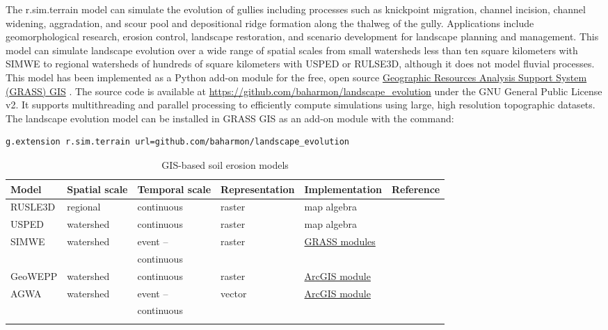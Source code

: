 \documentclass[gmd, manuscript]{copernicus}
\begin{document}
The r.sim.terrain model
can simulate the evolution of gullies
including processes such as 
knickpoint migration,
channel incision, 
channel widening, 
aggradation, and
scour pool and 
depositional ridge formation
along the thalweg of the gully. 
Applications include 
geomorphological research,
erosion control, 
landscape restoration, 
and scenario development 
for landscape planning and management.
This model can simulate landscape evolution 
over a wide range of spatial scales 
from small watersheds 
less than ten square kilometers
with SIMWE
to regional watersheds
of hundreds of square kilometers
with USPED or RULSE3D,
although it does not model fluvial processes. 
This model has been implemented 
as a Python add-on module 
for the free, open source
\href{https://grass.osgeo.org/}{Geographic Resources Analysis Support System (GRASS) GIS}
\citep{GRASS}. 
The source code is available at 
\url{https://github.com/baharmon/landscape\_evolution} 
under the GNU General Public License v2. %
It supports multithreading and parallel processing
to efficiently compute simulations 
using large, high resolution topographic datasets.
%
The landscape evolution model 
can be installed in GRASS GIS as an add-on module 
with the command: 
\begin{lstlisting}
g.extension r.sim.terrain url=github.com/baharmon/landscape_evolution
\end{lstlisting}


\begin{table}
\small
\caption{GIS-based soil erosion models}
\begin{tabu} to \textwidth {XXXXXl}
\toprule
Model & Spatial scale &  Temporal scale & Representation & Implementation & Reference\\
\midrule
RUSLE3D & regional & continuous & raster & map algebra & \citep{Mitasova1996}\\
USPED & watershed & continuous & raster & map algebra & \citep{Mitasova1996}\\
SIMWE & watershed & event -- & raster & \href{https://grass.osgeo.org/grass74/manuals/r.sim.sediment.html}{GRASS modules} & \citep{Mitas1998}\\
&& continuous\\
GeoWEPP & watershed & continuous & raster & \href{http://geowepp.geog.buffalo.edu/}{ArcGIS module} & \citep{Flanagan2013}\\
AGWA  & watershed & event -- & vector & \href{https://www.tucson.ars.ag.gov/agwa/}{ArcGIS module} & \citep{Guertin2015}\\
&& continuous\\
\bottomrule
\\
\end{tabu}
\label{table:erosion_models}
\end{table}
\end{document}

